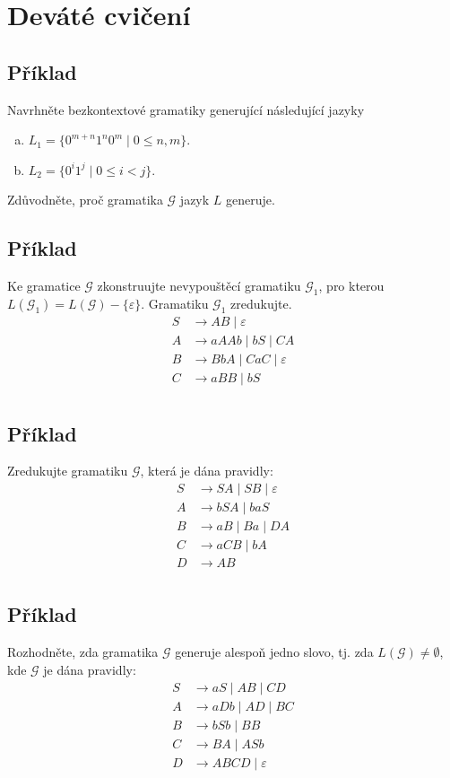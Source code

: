 \section{Deváté cvičení}

\subsection{Příklad}
Navrhněte bezkontextové gramatiky generující následující jazyky
\begin{enumerate}[a), noitemsep]
    \item $L_1 = \{0^{m+n} 1^n 0^m \mid 0 \leq n,m\}$.
    \item $L_2 = \{0^i 1^j \mid 0 \leq i < j\}$.
\end{enumerate}
Zdůvodněte, proč gramatika $\mathcal{G}$ jazyk $L$ generuje.

\subsection{Příklad}
Ke gramatice $\mathcal{G}$ zkonstruujte nevypouštěcí gramatiku $\mathcal{G}_1$, pro kterou $L(\mathcal{G}_1) = L(\mathcal{G}) - \{\varepsilon\}$. Gramatiku $\mathcal{G}_1$ zredukujte.
\begin{align*}
    S & \rightarrow AB \mid \varepsilon \\
    A & \rightarrow aAAb \mid bS \mid CA \\
    B & \rightarrow BbA \mid CaC \mid \varepsilon \\ 
    C & \rightarrow aBB \mid bS \\
\end{align*}

\subsection{Příklad}
Zredukujte gramatiku $\mathcal{G}$, která je dána pravidly:
\begin{align*}
    S & \rightarrow SA \mid SB \mid \varepsilon \\
    A & \rightarrow bSA \mid baS \\
    B & \rightarrow aB \mid Ba \mid DA \\ 
    C & \rightarrow aCB \mid bA \\
    D & \rightarrow AB \\
\end{align*}

\subsection{Příklad}
Rozhodněte, zda gramatika $\mathcal{G}$ generuje alespoň jedno slovo, tj. zda $L(\mathcal{G}) \not= \emptyset$, kde $\mathcal{G}$ je dána pravidly:
\begin{align*}
    S & \rightarrow aS \mid AB \mid CD \\
    A & \rightarrow aDb \mid AD \mid BC \\
    B & \rightarrow bSb \mid BB \\ 
    C & \rightarrow BA \mid ASb \\
    D & \rightarrow ABCD \mid \varepsilon\\
\end{align*}


